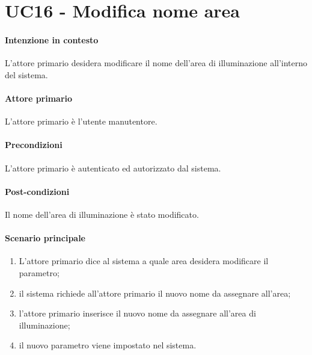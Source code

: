 \section{UC16 - Modifica nome area}\label{uc:16}
\paragraph{Intenzione in contesto} L'attore primario desidera modificare il nome dell'area di illuminazione all'interno del sistema.
\paragraph{Attore primario} L'attore primario è l'utente manutentore.
\paragraph{Precondizioni} L'attore primario è autenticato ed autorizzato dal sistema.
\paragraph{Post-condizioni} Il nome dell'area di illuminazione è stato modificato.
\paragraph{Scenario principale}
\begin{enumerate}
    \item L'attore primario dice al sistema a quale area desidera modificare il parametro;
    \item il sistema richiede all'attore primario il nuovo nome da assegnare all'area;
    \item l'attore primario inserisce il nuovo nome da assegnare all'area di illuminazione;
    \item il nuovo parametro viene impostato nel sistema.
\end{enumerate}